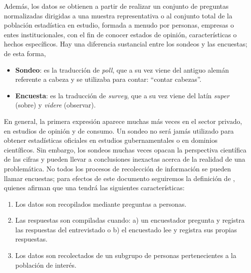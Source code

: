 \documentclass[
  12pt,
]{book}
\providecommand{\tightlist}{%
  \setlength{\itemsep}{0pt}\setlength{\parskip}{0pt}}
\begin{document}
Además, los datos se obtienen a partir de realizar un conjunto de preguntas normalizadas dirigidas a una muestra representativa o al conjunto total de la población estadística en estudio, formada a menudo por personas, empresas o entes institucionales, con el fin de conocer estados de opinión, características o hechos específicos. Hay una diferencia sustancial entre los sondeos y las encuestas; de esta forma,

\begin{itemize}
\tightlist
\item
  \textbf{Sondeo}: es la traducción de \emph{poll}, que a su vez viene del antiguo alemán referente a cabeza y se utilizaba para contar: ``contar cabezas''.
\item
  \textbf{Encuesta}: es la traducción de \emph{survey}, que a su vez viene del latín \emph{super} (sobre) y \emph{videre} (observar).
\end{itemize}

En general, la primera expresión aparece muchas más veces en el sector privado, en estudios de opinión y de consumo. Un sondeo no será jamás utilizado para obtener estadísticas oficiales en estudios gubernamentales o en dominios científicos. Sin embargo, los sondeos muchas veces opacan la perspectiva científica de las cifras y pueden llevar a conclusiones inexactas acerca de la realidad de una problemática. No todos los procesos de recolección de información se pueden llamar encuestas; para efectos de este documento seguiremos la definición de \citet{Groves_Fowler_Couper_Lepkowski_Singer_Tourangeau_2009}, quienes afirman que una tendrá las siguientes características:

\begin{enumerate}
\def\labelenumi{\arabic{enumi}.}
\tightlist
\item
  Los datos son recopilados mediante preguntas a personas.
\item
  Las respuestas son compiladas cuando: a) un encuestador pregunta y registra las respuestas del entrevistado o b) el encuestado lee y registra sus propias respuestas.
\item
  Los datos son recolectados de un subgrupo de personas pertenecientes a la población de interés.
\end{enumerate}
\end{document}
